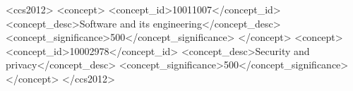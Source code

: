 \documentclass[manuscript,screen]{acmart}
\begin{document}
\begin{abstract}

\end{abstract}


\begin{CCSXML}
  <ccs2012>
     <concept>
         <concept_id>10011007</concept_id>
         <concept_desc>Software and its engineering</concept_desc>
         <concept_significance>500</concept_significance>
         </concept>
     <concept>
         <concept_id>10002978</concept_id>
         <concept_desc>Security and privacy</concept_desc>
         <concept_significance>500</concept_significance>
         </concept>
   </ccs2012>
\end{CCSXML}
  


\maketitle










\clearpage


\clearpage

\end{document}
